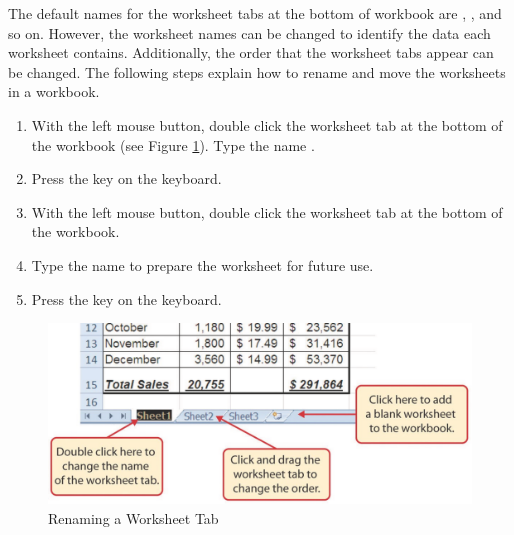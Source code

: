 The default names for the worksheet tabs at the bottom of workbook are , , and so on. However, the worksheet names can be changed to identify the data each worksheet contains. Additionally, the order that the worksheet tabs appear can be changed. The following steps explain how to rename and move the worksheets in a workbook.

\begin{enumerate}
	\item With the left mouse button, double click the  worksheet tab at the bottom of the workbook (see Figure \ref{01:fig47}). Type the name .
	\item Press the  key on the keyboard.
	\item With the left mouse button, double click the  worksheet tab at the bottom of the workbook.
	\item Type the name  to prepare the worksheet for future use.
	\item Press the  key on the keyboard.
\end{enumerate}

\begin{figure}[H]
	\centering
	\includegraphics[width=\maxwidth{.95\linewidth}]{gfx/ch01_fig47}
	\caption{Renaming a Worksheet Tab}
	\label{01:fig47}
\end{figure}

